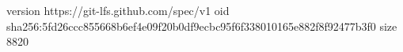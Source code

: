 version https://git-lfs.github.com/spec/v1
oid sha256:5fd26ccc855668b6ef4e09f20b0df9ecbc95f6f338010165e882f8f92477b3f0
size 8820
